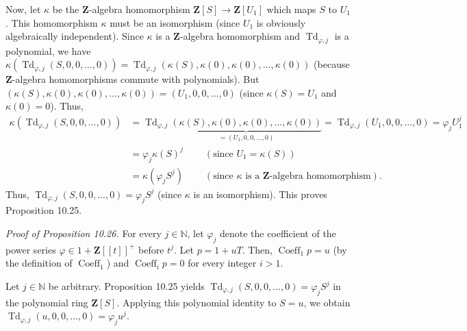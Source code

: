 \documentclass[numbers=enddot,12pt,final,onecolumn,notitlepage]{scrartcl}%
\begin{document}
Now, let $\kappa$ be the $\mathbf{Z}$-algebra homomorphism $\mathbf{Z}\left[
S\right]  \rightarrow\mathbf{Z}\left[  U_{1}\right]  $ which maps $S$ to
$U_{1}$. This homomorphism $\kappa$ must be an isomorphism (since $U_{1}$ is
obviously algebraically independent). Since $\kappa$ is a $\mathbf{Z}$-algebra
homomorphism and $\operatorname*{Td}\nolimits_{\varphi,j}$ is a polynomial, we
have $\kappa\left(  \operatorname*{Td}\nolimits_{\varphi,j}\left(
S,0,0,...,0\right)  \right)  =\operatorname*{Td}\nolimits_{\varphi,j}\left(
\kappa\left(  S\right)  ,\kappa\left(  0\right)  ,\kappa\left(  0\right)
,...,\kappa\left(  0\right)  \right)  $ (because $\mathbf{Z}$-algebra
homomorphisms commute with polynomials). But $\left(  \kappa\left(  S\right)
,\kappa\left(  0\right)  ,\kappa\left(  0\right)  ,...,\kappa\left(  0\right)
\right)  =\left(  U_{1},0,0,...,0\right)  $ (since $\kappa\left(  S\right)
=U_{1}$ and $\kappa\left(  0\right)  =0$). Thus,%
\begin{align*}
\kappa\left(  \operatorname*{Td}\nolimits_{\varphi,j}\left(
S,0,0,...,0\right)  \right)   &  =\operatorname*{Td}\nolimits_{\varphi
,j}\underbrace{\left(  \kappa\left(  S\right)  ,\kappa\left(  0\right)
,\kappa\left(  0\right)  ,...,\kappa\left(  0\right)  \right)  }_{=\left(
U_{1},0,0,...,0\right)  }=\operatorname*{Td}\nolimits_{\varphi,j}\left(
U_{1},0,0,...,0\right)  =\varphi_{j}U_{1}^{j}\\
&  =\varphi_{j}\kappa\left(  S\right)  ^{j}\ \ \ \ \ \ \ \ \ \ \left(
\text{since }U_{1}=\kappa\left(  S\right)  \right) \\
&  =\kappa\left(  \varphi_{j}S^{j}\right)  \ \ \ \ \ \ \ \ \ \ \left(
\text{since }\kappa\text{ is a }\mathbf{Z}\text{-algebra homomorphism}\right)
.
\end{align*}
Thus, $\operatorname*{Td}\nolimits_{\varphi,j}\left(  S,0,0,...,0\right)
=\varphi_{j}S^{j}$ (since $\kappa$ is an isomorphism). This proves Proposition 10.25.

\textit{Proof of Proposition 10.26.} For every $j\in\mathbb{N}$, let
$\varphi_{j}$ denote the coefficient of the power series $\varphi
\in1+\mathbf{Z}\left[  \left[  t\right]  \right]  ^{+}$ before $t^{j}$. Let
$p=1+uT$. Then, $\operatorname*{Coeff}\nolimits_{1}p=u$ (by the definition of
$\operatorname*{Coeff}\nolimits_{1}$) and $\operatorname*{Coeff}%
\nolimits_{i}p=0$ for every integer $i>1$.

Let $j\in\mathbb{N}$ be arbitrary. Proposition 10.25 yields
$\operatorname*{Td}\nolimits_{\varphi,j}\left(  S,0,0,...,0\right)
=\varphi_{j}S^{j}$ in the polynomial ring $\mathbf{Z}\left[  S\right]  $.
Applying this polynomial identity to $S=u$, we obtain $\operatorname*{Td}%
\nolimits_{\varphi,j}\left(  u,0,0,...,0\right)  =\varphi_{j}u^{j}$.
\end{document}
